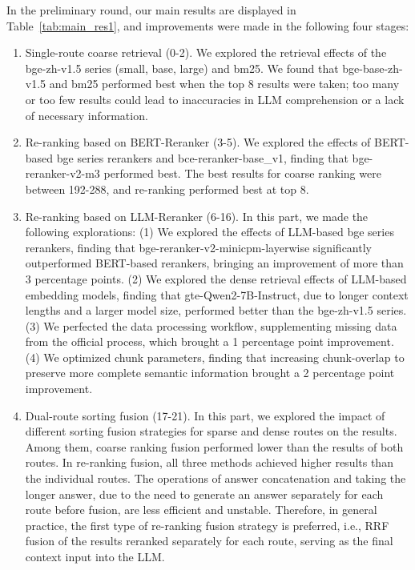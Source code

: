 \documentclass[11pt]{article}
\begin{document}
In the preliminary round, our main results are displayed in Table~\ref{tab:main_res1}, and improvements were made in the following four stages:
\begin{enumerate}
    \item Single-route coarse retrieval (0-2). We explored the retrieval effects of the bge-zh-v1.5 series (small, base, large) and bm25. We found that bge-base-zh-v1.5 and bm25 performed best when the top 8 results were taken; too many or too few results could lead to inaccuracies in LLM comprehension or a lack of necessary information.
    \item Re-ranking based on BERT-Reranker (3-5). We explored the effects of BERT-based bge series rerankers and bce-reranker-base\_v1, finding that bge-reranker-v2-m3 performed best. The best results for coarse ranking were between 192-288, and re-ranking performed best at top 8.
    \item Re-ranking based on LLM-Reranker (6-16). In this part, we made the following explorations: (1) We explored the effects of LLM-based bge series rerankers, finding that bge-reranker-v2-minicpm-layerwise significantly outperformed BERT-based rerankers, bringing an improvement of more than 3 percentage points. (2) We explored the dense retrieval effects of LLM-based embedding models, finding that gte-Qwen2-7B-Instruct, due to longer context lengths and a larger model size, performed better than the bge-zh-v1.5 series. (3) We perfected the data processing workflow, supplementing missing data from the official process, which brought a 1 percentage point improvement. (4) We optimized chunk parameters, finding that increasing chunk-overlap to preserve more complete semantic information brought a 2 percentage point improvement.
    \item Dual-route sorting fusion (17-21). In this part, we explored the impact of different sorting fusion strategies for sparse and dense routes on the results. Among them, coarse ranking fusion performed lower than the results of both routes. In re-ranking fusion, all three methods achieved higher results than the individual routes. The operations of answer concatenation and taking the longer answer, due to the need to generate an answer separately for each route before fusion, are less efficient and unstable. Therefore, in general practice, the first type of re-ranking fusion strategy is preferred, i.e., RRF fusion of the results reranked separately for each route, serving as the final context input into the LLM.
\end{enumerate}
\end{document}
